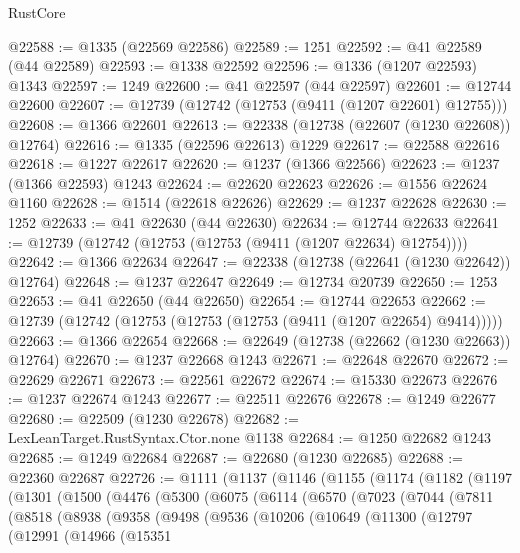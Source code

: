 \begin{lexlean}{RustCore}
\begin{coremodule}
@22588 := @1335 (@22569 @22586)
@22589 := 1251
@22592 := @41 @22589 (@44 @22589)
@22593 := @1338 @22592
@22596 := @1336 (@1207 @22593) @1343
@22597 := 1249
@22600 := @41 @22597 (@44 @22597)
@22601 := @12744 @22600
@22607 := @12739 (@12742 (@12753 (@9411 (@1207 @22601) @12755)))
@22608 := @1366 @22601
@22613 := @22338 (@12738 (@22607 (@1230 @22608)) @12764)
@22616 := @1335 (@22596 @22613) @1229
@22617 := @22588 @22616
@22618 := @1227 @22617
@22620 := @1237 (@1366 @22566)
@22623 := @1237 (@1366 @22593) @1243
@22624 := @22620 @22623
@22626 := @1556 @22624 @1160
@22628 := @1514 (@22618 @22626)
@22629 := @1237 @22628
@22630 := 1252
@22633 := @41 @22630 (@44 @22630)
@22634 := @12744 @22633
@22641 := @12739 (@12742 (@12753 (@12753 (@9411 (@1207 @22634) @12754))))
@22642 := @1366 @22634
@22647 := @22338 (@12738 (@22641 (@1230 @22642)) @12764)
@22648 := @1237 @22647
@22649 := @12734 @20739
@22650 := 1253
@22653 := @41 @22650 (@44 @22650)
@22654 := @12744 @22653
@22662 := @12739 (@12742 (@12753 (@12753 (@12753 (@9411 (@1207 @22654) @9414)))))
@22663 := @1366 @22654
@22668 := @22649 (@12738 (@22662 (@1230 @22663)) @12764)
@22670 := @1237 @22668 @1243
@22671 := @22648 @22670
@22672 := @22629 @22671
@22673 := @22561 @22672
@22674 := @15330 @22673
@22676 := @1237 @22674 @1243
@22677 := @22511 @22676
@22678 := @1249 @22677
@22680 := @22509 (@1230 @22678)
@22682 := LexLeanTarget.RustSyntax.Ctor.none @1138
@22684 := @1250 @22682 @1243
@22685 := @1249 @22684
@22687 := @22680 (@1230 @22685)
@22688 := @22360 @22687
@22726 := @1111
    (@1137
      (@1146
        (@1155
          (@1174
            (@1182
              (@1197
                (@1301
                  (@1500
                    (@4476
                      (@5300
                        (@6075
                          (@6114
                            (@6570
                              (@7023
                                (@7044
                                  (@7811
                                    (@8518
                                      (@8938
                                        (@9358
                                          (@9498
                                            (@9536
                                              (@10206
                                                (@10649
                                                  (@11300
                                                    (@12797
                                                      (@12991
                                                        (@14966
                                                          (@15351

\end{coremodule}
\end{lexlean}
